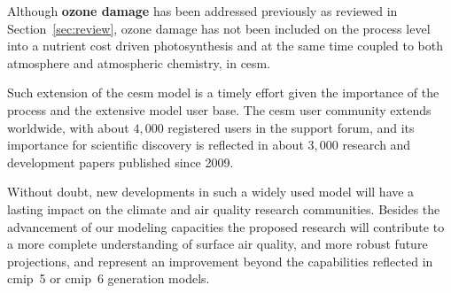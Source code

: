 Although \textbf{\color{red}ozone damage} has been addressed previously as reviewed in Section~\ref{sec:review}, ozone damage has not been included on the process level into a nutrient cost driven photosynthesis and at the same time coupled to both atmosphere and atmospheric chemistry, in \gls{cesm}.

Such extension of the \gls{cesm} model is a timely effort given the importance of the process and the extensive model user base. The \gls{cesm} user community extends worldwide, with about $4,000$ registered users in the support forum, and its importance for scientific discovery is reflected in about $3,000$ research and development papers published since 2009.

Without doubt, new developments in such a widely used model will have a lasting impact on the climate and air quality research communities. Besides the advancement of our modeling capacities the proposed research will contribute to a more complete understanding of surface air quality, and more robust future projections, and represent an improvement beyond the capabilities reflected in \gls{cmip}~5 or \gls{cmip}~6 generation models.
